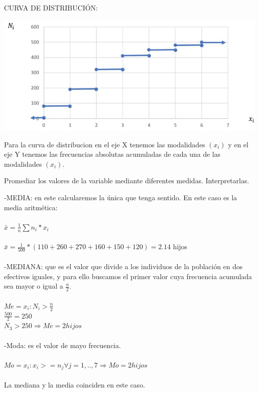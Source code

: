 \begin{center}

CURVA DE DISTRIBUCIÓN:
\begin{center}
	\includegraphics[scale=0.5]{curva-distribucion-ej-1.jpeg}
\end{center}
Para la curva de distribucion en el eje X tenemos las modalidades $(x_{i})$ y en el eje Y tenemos las frecuencias absolutas acumuladas de cada una de las modalidades $(x_{i})$. 
\end{center}
	 \begin{flushleft}
\subproblem
Promediar los valores de la variable mediante diferentes medidas. Interpretarlas.
\end{flushleft}
-MEDIA: en este calcularemos la única que tenga sentido. En este caso es la media aritmética: 
\\
\\
$\bar{x} = \frac{1}{n}  \sum   n_{i} * x_{i}$ 
\\
\\
$\bar{x} = \frac{1}{500} * (110 + 260 +270 + 160 + 150 + 120) = 2.14 $ hijos
\\
\\
-MEDIANA: que es el valor que divide a los individuos de la población en dos efectivos iguales, y para ello buscamos el primer valor cuya frecuencia acumulada sea mayor o igual a $\frac{n}{2}$.
\\
\\
$Me = x_{i} : N_{i} > \frac{n}{2}$
\\

$\frac{500}{2} = 250$ 
\\

$N_{3} > 250  \Rightarrow Me = 2 hijos  $
\\
\\
-Moda: es el valor de mayo frecuencia.
\\
\\
$Mo = x_{i} :x_{i} >= n_{j} \forall j=1,..,7  \Rightarrow Mo = 2 hijos$
\\
\\
\textrightarrow La mediana y la media coinciden en este caso.
\\
\\